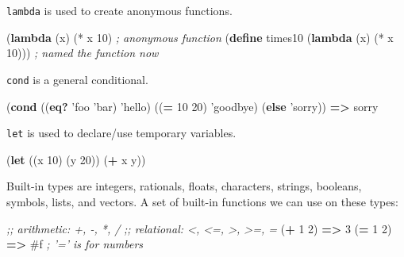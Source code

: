\documentclass[12pt,a4paper,oneside,openright]{book}
\newenvironment{Shaded}{\begin{snugshade}}{\end{snugshade}}
\newcommand{\KeywordTok}[1]{\textcolor[rgb]{0.13,0.29,0.53}{\textbf{{#1}}}}
\newcommand{\DecValTok}[1]{\textcolor[rgb]{0.00,0.00,0.81}{{#1}}}
\newcommand{\CommentTok}[1]{\textcolor[rgb]{0.56,0.35,0.01}{\textit{{#1}}}}
\newcommand{\FunctionTok}[1]{\textcolor[rgb]{0.00,0.00,0.00}{{#1}}}
\newcommand{\NormalTok}[1]{{#1}}
\begin{document}
\texttt{lambda} is used to create anonymous functions.

\begin{Shaded}
\begin{Highlighting}[]
    \NormalTok{(}\KeywordTok{lambda} \NormalTok{(x) (* x }\DecValTok{10}\NormalTok{)                   }\CommentTok{; anonymous function}
    \NormalTok{(}\KeywordTok{define}\FunctionTok{ times10 }\NormalTok{(}\KeywordTok{lambda} \NormalTok{(x) (* x }\DecValTok{10}\NormalTok{))) }\CommentTok{; named the function now}
\end{Highlighting}
\end{Shaded}

\texttt{cond} is a general conditional.

\begin{Shaded}
\begin{Highlighting}[]
    \NormalTok{(}\KeywordTok{cond}
      \NormalTok{((}\KeywordTok{eq?} \NormalTok{'foo 'bar) 'hello)}
      \NormalTok{((}\KeywordTok{=} \DecValTok{10} \DecValTok{20}\NormalTok{) 'goodbye)}
      \NormalTok{(}\KeywordTok{else} \NormalTok{'sorry))                  }\KeywordTok{=>} \NormalTok{sorry}
\end{Highlighting}
\end{Shaded}

\texttt{let} is used to declare/use temporary variables.

\begin{Shaded}
\begin{Highlighting}[]
    \NormalTok{(}\KeywordTok{let} \NormalTok{((x }\DecValTok{10}\NormalTok{)}
          \NormalTok{(y }\DecValTok{20}\NormalTok{))}
      \NormalTok{(}\KeywordTok{+} \NormalTok{x y))}
\end{Highlighting}
\end{Shaded}

Built-in types are integers, rationals, floats, characters, strings,
booleans, symbols, lists, and vectors. A set of built-in functions we
can use on these types:

\begin{Shaded}
\begin{Highlighting}[]
    \CommentTok{;; arithmetic:  +, -, *, /}
    \CommentTok{;; relational: <, <=, >, >=, =}
    \NormalTok{(}\KeywordTok{+} \DecValTok{1} \DecValTok{2}\NormalTok{)                    }\KeywordTok{=>} \DecValTok{3}
    \NormalTok{(}\KeywordTok{=} \DecValTok{1} \DecValTok{2}\NormalTok{)                    }\KeywordTok{=>} \DecValTok{#f} \CommentTok{; '=' is for numbers}
\end{Highlighting}
\end{Shaded}
\end{document}
